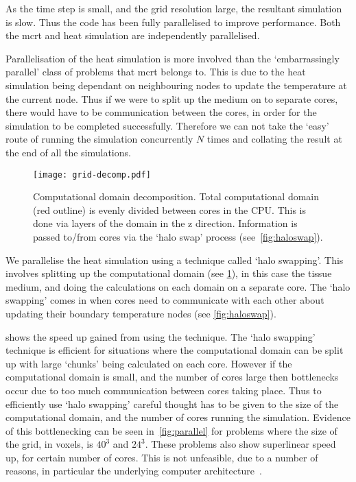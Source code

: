 As the time step is small, and the grid resolution large, the resultant simulation is slow. Thus the code has been fully parallelised to improve performance. Both the \gls{mcrt} and heat simulation are independently parallelised. 

\medskip

Parallelisation of the heat simulation is more involved than the `embarrassingly parallel' class of problems that \gls{mcrt} belongs to. This is due to the heat simulation being dependant on neighbouring nodes to update the temperature at the current node. Thus if we were to split up the medium on to separate cores, there would have to be communication between the cores, in order for the simulation to be completed successfully. Therefore we can not take the `easy' route of running the simulation concurrently $N$ times and collating the result at the end of all the simulations.


\begin{figure}
\vspace{-45pt}
\centering
\texttt{[image: grid-decomp.pdf]}
\caption{Computational domain decomposition. Total computational domain (red outline) is evenly divided between cores in the CPU. This is done via layers of the domain in the z direction. Information is passed to/from cores via the `halo swap' process (see~\cref{fig:haloswap}).}
\label{fig:griddecomp}
\vspace{-10pt}
\end{figure}

We parallelise the heat simulation using a technique called `halo swapping'. This involves splitting up the computational domain (see \cref{fig:griddecomp}), in this case the tissue medium, and doing the calculations on each domain on a separate core. The `halo swapping' comes in when cores need to communicate with each other about updating their boundary temperature nodes (see \cref{fig:haloswap}).

 shows the speed up gained from using the technique. The `halo swapping' technique is efficient for situations where the computational domain can be split up with large `chunks' being calculated on each core. However if the computational domain is small, and the number of cores large then bottlenecks occur due to too much communication between cores taking place. Thus to efficiently use `halo swapping' careful thought has to be given to the size of the computational domain, and the number of cores running the simulation. Evidence of this bottlenecking can be seen in~\cref{fig:parallel} for problems where the size of the grid, in voxels, is $40^3$ and $24^3$. These problems also show superlinear speed up, for certain number of cores. This is not unfeasible, due to a number of reasons, in particular the underlying computer architecture~\cite{ristov2016superlinear}.

